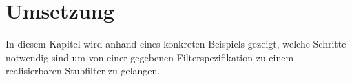 \section{Umsetzung}

In diesem Kapitel wird anhand eines konkreten Beispiels gezeigt, welche Schritte notwendig sind um von einer gegebenen Filterspezifikation zu einem realisierbaren Stubfilter zu gelangen.






